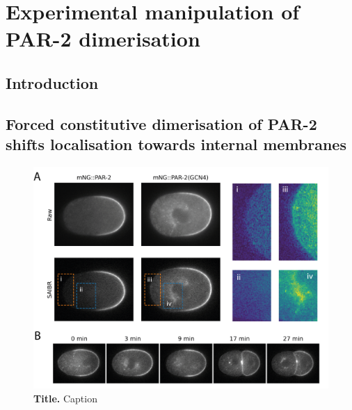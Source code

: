 \documentclass[12pt]{"article"}
\newcommand{\mycaption}[2]{\caption[#1]{\textbf{#1.} #2}}
\begin{document}
\clearpage
\section{Experimental manipulation of PAR-2 dimerisation}

\subsection{Introduction}

\subsection{Forced constitutive dimerisation of PAR-2 shifts localisation towards internal membranes}



\begin{figure}[!h]
\includegraphics[scale=1]{gcn4}
\setlength{\abovecaptionskip}{20pt}
\centering
\mycaption{Title}{Caption}
\label{fig:gcn4}
\end{figure}
\end{document}
